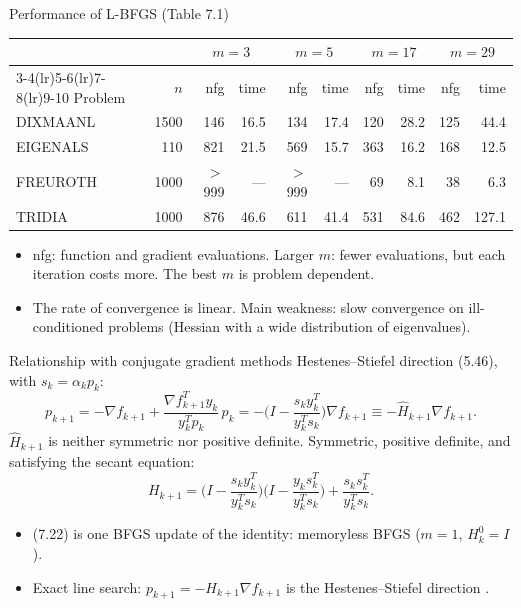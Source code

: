 \documentclass[aspectratio=169,12pt]{beamer}
\newcommand{\gradf}{\nabla f}
\newcommand{\eqn}[1]{\text{\small(#1)}}
\begin{document}
\begin{frame}{Performance of L-BFGS (Table 7.1)}
  \begin{center}
  \small\setlength\tabcolsep{5pt}
  \begin{tabular}{lr rr rr rr rr}
    \toprule
    & & \multicolumn{2}{c}{$m=3$} & \multicolumn{2}{c}{$m=5$} & \multicolumn{2}{c}{$m=17$} & \multicolumn{2}{c}{$m=29$} \\
    \cmidrule(lr){3-4}\cmidrule(lr){5-6}\cmidrule(lr){7-8}\cmidrule(lr){9-10}
    Problem & $n$ & nfg & time & nfg & time & nfg & time & nfg & time \\
    \midrule
    DIXMAANL & 1500 & 146 & 16.5 & 134 & 17.4 & 120 & 28.2 & 125 & 44.4 \\
    EIGENALS & 110 & 821 & 21.5 & 569 & 15.7 & 363 & 16.2 & 168 & 12.5 \\
    FREUROTH & 1000 & $>$999 & --- & $>$999 & --- & 69 & 8.1 & 38 & 6.3 \\
    TRIDIA & 1000 & 876 & 46.6 & 611 & 41.4 & 531 & 84.6 & 462 & 127.1 \\
    \bottomrule
  \end{tabular}
  \end{center}

  \begin{itemize}\setlength\itemsep{0.3em}
    \item nfg: function and gradient evaluations. Larger $m$: fewer evaluations, but each
      iteration costs more. The best $m$ is problem dependent.
    \item The rate of convergence is linear. \alert{Main weakness:} slow convergence on
      ill-conditioned problems (Hessian with a wide distribution of eigenvalues).
  \end{itemize}
\end{frame}

\begin{frame}{Relationship with conjugate gradient methods}
  Hestenes--Stiefel direction (5.46), with $s_{k}=\alpha_{k}p_{k}$:
  \[
    p_{k+1}=-\gradf_{k+1}+\frac{\gradf_{k+1}^{T}y_{k}}{y_{k}^{T}p_{k}}\,p_{k}
    =-\Big(I-\frac{s_{k}y_{k}^{T}}{y_{k}^{T}s_{k}}\Big)\gradf_{k+1}\equiv-\hat H_{k+1}\gradf_{k+1} .
    \tag{7.21}
  \]
  $\hat H_{k+1}$ is neither symmetric nor positive definite. Symmetric, positive definite, and
  satisfying the secant equation:
  \[
    H_{k+1}=\Big(I-\frac{s_{k}y_{k}^{T}}{y_{k}^{T}s_{k}}\Big)\Big(I-\frac{y_{k}s_{k}^{T}}{y_{k}^{T}s_{k}}\Big)
    +\frac{s_{k}s_{k}^{T}}{y_{k}^{T}s_{k}} .
    \tag{7.22}
  \]
  \begin{itemize}\setlength\itemsep{0.25em}
    \item (7.22) is one BFGS update of the identity: \alert{memoryless BFGS} ($m=1$, $H_{k}^{0}=I$).
    \item Exact line search: $p_{k+1}=-H_{k+1}\gradf_{k+1}$ is the Hestenes--Stiefel direction \eqn{7.23}.
  \end{itemize}
\end{frame}
\end{document}
